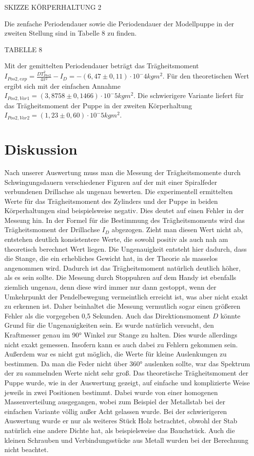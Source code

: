    SKIZZE KÖRPERHALTUNG 2

    Die zenfache Periodendauer sowie die Periodendauer der Modellpuppe
    in der zweiten Stellung sind in Tabelle 8 zu finden.

    TABELLE 8

    Mit der gemittelten Periodendauer beträgt das Trägheitsmoment $I_{Pos2,exp} = \frac{DT_{Pos2}^2}{4\pi^2} - I_D = -(6,47 \pm 0,11) \cdot 10^-4 kg m^2$.
    Für den theoretischen Wert ergibt sich mit der einfachen Annahme $I_{Pos2,Var1} = (3,8758 \pm 0,1466) \cdot 10^-5 kg m^2$.
    Die schwierigere Variante liefert für das Trägheitsmoment der Puppe in der zweiten Körperhaltung
    $I_{Pos2,Var2} = (1,23 \pm 0,60) \cdot 10^-5 kg m^2$.

    \section{Diskussion}
    Nach unserer Auswertung muss man die Messung der Trägheitsmomente durch Schwingungsdauern verschiedener Figuren auf der mit einer Spiralfeder verbundenen Drillachse als ungenau bewerten.
Die experimentell ermittelten Werte für das Trägheitsmoment des Zylinders und der Puppe in beiden Körperhaltungen sind beispielsweise negativ. Dies deutet auf einen Fehler in der Messung hin. In der Formel für die Bestimmung des Trägheitsmoments wird das Trägheitsmoment der Drillachse $I_D$ abgezogen. Zieht man diesen Wert nicht ab, entstehen deutlich konsistentere Werte, die sowohl positiv als auch nah am theoretisch berechnet Wert liegen.
    Die Ungenauigkeit entsteht hier dadurch, dass die Stange, die ein erhebliches Gewicht hat, in der Theorie als masselos angenommen wird. Dadurch ist das Trägheitsmoment natürlich deutlich höher, als es sein sollte.
    Die Messung durch Stoppuhren auf dem Handy ist ebenfalls ziemlich ungenau, denn diese wird immer nur dann gestoppt, wenn der Umkehrpunkt der Pendelbewegung vermeintlich erreicht ist, was aber nicht exakt zu erkennen ist. Daher beinhaltet die Messung vermutlich sogar einen größeren Fehler als die vorgegeben 0,5 Sekunden. 
    Auch das Direktionsmoment $D$ könnte Grund für die Ungenauigkeiten sein. Es wurde natürlich versucht, den Kraftmesser genau im 90° Winkel zur Stange zu halten. Dies wurde allerdings nicht exakt gemessen. Insofern kann es auch dabei zu Fehlern gekommen sein. Außerdem war es nicht gut möglich, die Werte für kleine Auslenkungen zu bestimmen. Da man die Feder nicht über 360° auslenken sollte, war das Spektrum der zu sammelnden Werte nicht sehr groß.
    Das theoretische Trägheitsmoment der Puppe wurde, wie in der Auswertung gezeigt, auf einfache und komplizierte Weise jeweils in zwei Positionen bestimmt. Dabei wurde von einer homogenen Massenverteilung ausgegangen, wobei zum Beispiel der Metallstab bei der einfachen Variante völlig außer Acht gelassen wurde. Bei der schwierigeren Auswertung wurde er nur als weiteres Stück Holz betrachtet, obwohl der Stab natürlich eine andere Dichte hat, als beispielsweise das Bauchstück. Auch die kleinen Schrauben und Verbindungsstücke aus Metall wurden bei der Berechnung nicht beachtet. 
